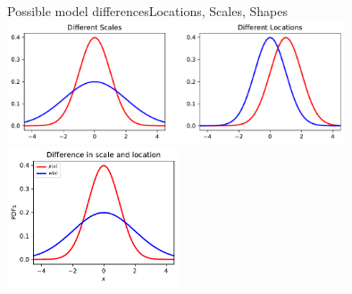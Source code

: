 \begin{frame}{Possible model differences}{Locations, Scales, Shapes}
\centering
	\includegraphics[width=0.75\textwidth]{../../figs/2GaussianPDFs2Scales2Locations.pdf}
	\includegraphics[width=0.38\textwidth]{../../figs/pdfs_diff_scale_and_loc.pdf}
\end{frame}


